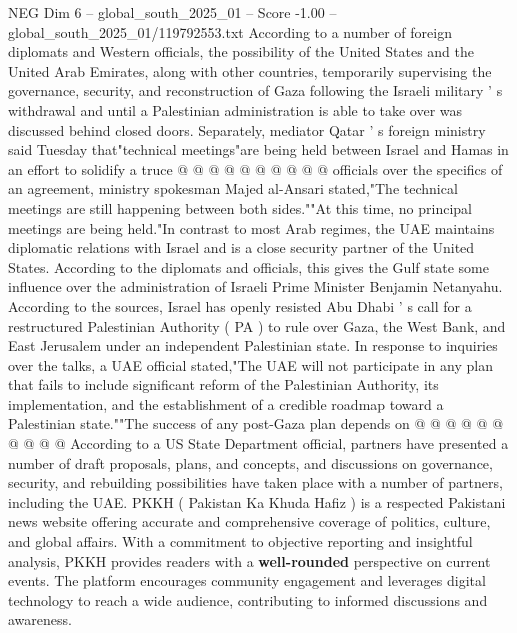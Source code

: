 \begin{textsample}{NEG Dim 6 – global\_south\_2025\_01 – Score -1.00 – global\_south\_2025\_01/119792553.txt}
According to a number of foreign diplomats and Western officials, the possibility of the United States and the United Arab Emirates, along with other countries, temporarily supervising the governance, security, and reconstruction of Gaza following the Israeli military ' s withdrawal and until a Palestinian administration is able to take over was discussed behind closed doors.
Separately, mediator Qatar ' s foreign ministry said Tuesday that"technical meetings"are being held between Israel and Hamas in an effort to solidify a truce @ @ @ @ @ @ @ @ @ @ officials over the specifics of an agreement, ministry spokesman Majed al-Ansari stated,"The technical meetings are still happening between both sides.""At this time, no principal meetings are being held."In contrast to most Arab regimes, the UAE maintains diplomatic relations with Israel and is a close security partner of the United States.
According to the diplomats and officials, this gives the Gulf state some influence over the administration of Israeli Prime Minister Benjamin Netanyahu.
According to the sources, Israel has openly resisted Abu Dhabi ' s call for a restructured Palestinian Authority ( PA ) to rule over Gaza, the West Bank, and East Jerusalem under an independent Palestinian state.
In response to inquiries over the talks, a UAE official stated,"The UAE will not participate in any plan that fails to include significant reform of the Palestinian Authority, its implementation, and the establishment of a credible roadmap toward a Palestinian state.""The success of any post-Gaza plan depends on @ @ @ @ @ @ @ @ @ @ According to a US State Department official, partners have presented a number of draft proposals, plans, and concepts, and discussions on governance, security, and rebuilding possibilities have taken place with a number of partners, including the UAE.
PKKH ( Pakistan Ka Khuda Hafiz ) is a respected Pakistani news website offering accurate and comprehensive coverage of politics, culture, and global affairs.
With a commitment to objective reporting and insightful analysis, PKKH provides readers with a \textbf{well-rounded} perspective on current events.
The platform encourages community engagement and leverages digital technology to reach a wide audience, contributing to informed discussions and awareness.

\end{textsample}
